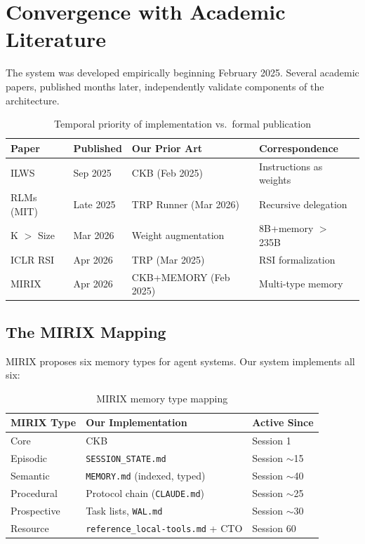 \documentclass[11pt, a4paper]{article}
\begin{document}
\section{Convergence with Academic Literature}
\label{sec:validation}

The system was developed empirically beginning February 2025. Several academic papers, published months later, independently validate components of the architecture.

\begin{table}[h]
\centering
\caption{Temporal priority of implementation vs.\ formal publication}
\label{tab:validation}
\begin{tabular}{@{}llll@{}}
\toprule
\textbf{Paper} & \textbf{Published} & \textbf{Our Prior Art} & \textbf{Correspondence} \\
\midrule
ILWS & Sep 2025 & CKB (Feb 2025) & Instructions as weights \\
RLMs (MIT) & Late 2025 & TRP Runner (Mar 2026) & Recursive delegation \\
K $>$ Size & Mar 2026 & Weight augmentation & 8B+memory $>$ 235B \\
ICLR RSI & Apr 2026 & TRP (Mar 2025) & RSI formalization \\
MIRIX & Apr 2026 & CKB+MEMORY (Feb 2025) & Multi-type memory \\
\bottomrule
\end{tabular}
\end{table}

\subsection{The MIRIX Mapping}

MIRIX \citep{mirix2026} proposes six memory types for agent systems. Our system implements all six:

\begin{table}[h]
\centering
\caption{MIRIX memory type mapping}
\label{tab:mirix}
\begin{tabular}{@{}lll@{}}
\toprule
\textbf{MIRIX Type} & \textbf{Our Implementation} & \textbf{Active Since} \\
\midrule
Core & CKB & Session 1 \\
Episodic & \texttt{SESSION\_STATE.md} & Session $\sim$15 \\
Semantic & \texttt{MEMORY.md} (indexed, typed) & Session $\sim$40 \\
Procedural & Protocol chain (\texttt{CLAUDE.md}) & Session $\sim$25 \\
Prospective & Task lists, \texttt{WAL.md} & Session $\sim$30 \\
Resource & \texttt{reference\_local-tools.md} + CTO & Session 60 \\
\bottomrule
\end{tabular}
\end{table}
\end{document}
